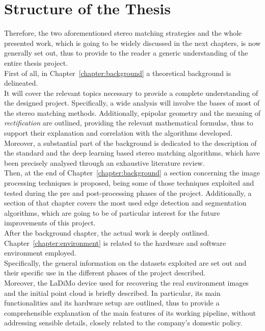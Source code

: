 \section{Structure of the Thesis}
\label{section:structure-of-thesis} 

Therefore, the two aforementioned stereo matching strategies and the whole presented work, which is going to be widely discussed in the next chapters, is now generally set out, thus to provide to the reader a generic understanding of the entire thesis project. \\ 
First of all, in Chapter~\ref{chapter:background} a theoretical background is delineated.\\
It will cover the relevant topics necessary to provide a complete understanding of the designed project.
Specifically, a wide analysis will involve the bases of most of the stereo matching methods.
Additionally, epipolar geometry and the meaning of \textit{rectification} are outlined, providing the relevant mathematical formulas, thus to support their explanation and correlation with the algorithms developed. \\
Moreover, a substantial part of the background is dedicated to the description of the standard and the deep learning based stereo matching algorithms, which have been precisely analysed through an exhaustive literature review.\\
Then, at the end of Chapter~\ref{chapter:background} a section concerning the image processing techniques is proposed, being some of those techniques exploited and tested during the pre and post-processing phases of the project.
Additionally, a section of that chapter covers the most used edge detection and segmentation algorithms, which are going to be of particular interest for the future improvements of this project.\\
After the background chapter, the actual work is deeply outlined.
Chapter~\ref{chapter:environment} is related to the hardware and software environment employed.\\
Specifically, the general information on the datasets exploited are set out and their specific use in the different phases of the project described.\\
Moreover, the LaDiMo device used for recovering the real environment images and the initial point cloud is briefly described. 
In particular, its main functionalities and its hardware setup are outlined, thus to provide a comprehensible explanation of the main features of its working pipeline, without addressing sensible details, closely related to the company's domestic policy.\\
